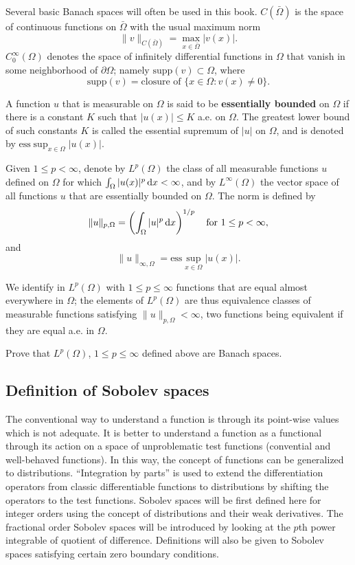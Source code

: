 Several basic Banach spaces will often be used in this book. $C(\bar{\Omega})$ is the space of continuous functions on $\bar{\Omega}$
with the usual maximum norm
\[
\|v\|_{C(\bar{\Omega})}=\max_{x\in\bar{\Omega}}|v(x)|.
\]
$C_0^{\infty}(\Omega)$ denotes the space of infinitely differential functions in $\Omega$
 that vanish in some neighborhood of $\partial\Omega$; namely $\mathrm{supp}(v)\subset\Omega$, where
 \[
 \textrm{supp}(v)=\textrm{closure of }\{x\in\Omega: v(x)\neq0\}.
 \]

A function $u$ that is measurable on $\Omega$ is said to be
\textbf{essentially bounded} on $\Omega$ if there is a constant $K$ such that $|u(x)|\leq K$ a.e. on $\Omega$.
The greatest lower bound of such constants $K$ is called the essential supremum of
$|u|$ on $\Omega$, and is denoted by $\textrm{ess}\sup_{x\in\Omega}|u(x)|$.

Given $1\leq p<\infty$, denote by $L^p(\Omega)$ the class of all measurable functions $u$ defined on
$\Omega$ for which $\int_{\Omega}|u(x)|^p\,{\rm d}x<\infty$, and by $L^{\infty}(\Omega)$ the vector space of all functions $u$ that are essentially bounded on $\Omega$.
The norm is defined by
\[
\|u\|_{p,\Omega}=\left(\int_{\Omega}|u|^p\,{\rm d}x\right)^{1/p}\quad\textrm{for }1\leq p<\infty,
\]
and
\[
\|u\|_{\infty,\Omega}=\textrm{ess}\sup_{x\in\Omega}|u(x)|.
\]

We identify in $L^p(\Omega)$ with $1\leq p\leq\infty$ functions that are equal almost everywhere in $\Omega$; the elements
of $L^p(\Omega)$ are thus equivalence classes of measurable functions satisfying $\|u\|_{p,\Omega}<\infty$, two
functions being equivalent if they are equal a.e. in $\Omega$.

\begin{exe}
Prove that $L^p(\Omega)$, $1\leq p\leq\infty$ defined above are Banach spaces.
\end{exe}


\subsection{Definition of Sobolev spaces}
The conventional way to understand a function is
through its point-wise values which is not adequate. It is better to understand a function as
a functional through its action on a space of unproblematic test functions (convential and
well-behaved functions). In this way, the concept of functions can be generalized to distributions.
``Integration by parts'' is used to extend the differentiation operators from classic
differentiable functions to distributions by shifting the operators to the test functions.
Sobolev spaces will be first defined here for integer orders using the concept of distributions
and their weak derivatives. The fractional order Sobolev spaces will be introduced
by looking at the $p$th power integrable of quotient of difference. Definitions will also be
given to Sobolev spaces satisfying certain zero boundary conditions.

